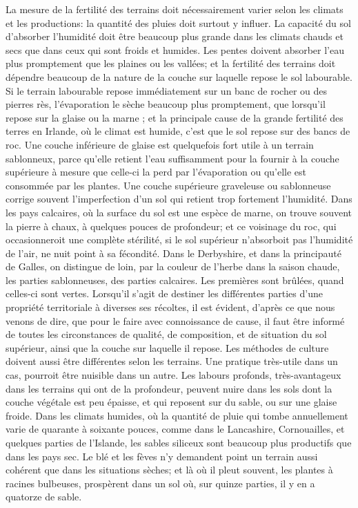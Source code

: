 La mesure de la fertilité des terrains doit nécessairement varier selon les climats et les productions: la quantité des pluies doit surtout y influer.
La capacité du sol d'absorber l'humidité doit être beaucoup plus grande dans les climats chauds et secs que dans ceux qui sont froids et humides. Les pentes doivent absorber l'eau plus promptement que les plaines ou les vallées; et la fertilité des terrains doit dépendre beaucoup de la nature de la couche sur laquelle repose le sol labourable.
Si le terrain labourable repose immédiatement sur un banc de rocher ou des pierres\setcounter{page}{465} rès, l'évaporation le sèche beaucoup plus promptement, que lorsqu'il repose sur la glaise ou la marne ; et la principale cause de la grande fertilité des terres en Irlande, où le climat est humide, c'est que le sol repose sur des bancs de roc.
Une couche inférieure de glaise est quelquefois fort utile à un terrain sablonneux, parce qu'elle retient l'eau suffisamment pour la fournir à la couche supérieure à mesure que celle-ci la perd par l'évaporation ou qu'elle est consommée par les plantes.
Une couche supérieure graveleuse ou sablonneuse corrige souvent l'imperfection d'un sol qui retient trop fortement l'humidité.
Dans les pays calcaires, où la surface du sol est une espèce de marne, on trouve souvent la pierre à chaux, à quelques pouces de profondeur; et ce voisinage du roc, qui occasionneroit une complète stérilité, si le sol supérieur n'absorboit pas l'humidité de l'air, ne nuit point à sa fécondité. Dans le Derbyshire, et dans la principauté de Galles, on distingue de loin, par la couleur de l'herbe dans la saison chaude, les parties sablonneuses, des parties calcaires. Les premières sont brûlées, quand celles-ci sont vertes.
Lorsqu'il s'agit de destiner les différentes parties d'une propriété territoriale à diverses\setcounter{page}{466} ses récoltes, il est évident, d'après ce que nous venons de dire, que pour le faire avec connoissance de cause, il faut être informé de toutes les circonstances de qualité, de composition, et de situation du sol supérieur, ainsi que la couche sur laquelle il repose.
Les méthodes de culture doivent aussi être différentes selon les terrains. Une pratique très-utile dans un cas, pourroit être nuisible dans un autre. Les labours profonds, très-avantageux dans les terrains qui ont de la profondeur, peuvent nuire dans les sols dont la couche végétale est peu épaisse, et qui reposent sur du sable, ou sur une glaise froide.
Dans les climats humides, où la quantité de pluie qui tombe annuellement varie de quarante à soixante pouces, comme dans le Lancashire, Cornouailles, et quelques parties de l'Islande, les sables siliceux sont beaucoup plus productifs que dans les pays sec. Le blé et les fèves n'y demandent point un terrain aussi cohérent que dans les situations sèches; et là où il pleut souvent, les plantes à racines bulbeuses, prospèrent dans un sol où, sur quinze parties, il y en a quatorze de sable.

